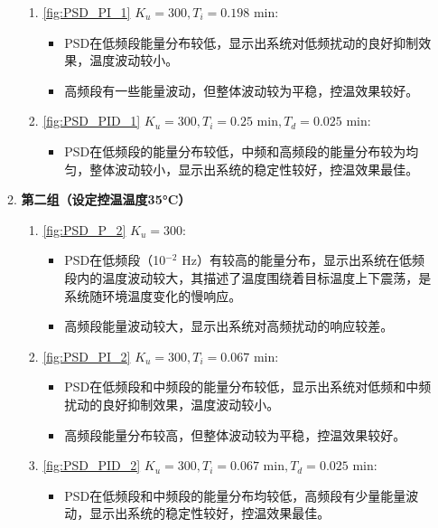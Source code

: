 \documentclass[dvipsnames, svgnames,a4paper,11pt]{article}
\begin{document}
\begin{enumerate}
\begin{enumerate}
\begin{enumerate}
                \item \cref{fig:PSD_PI_1} \( K_u = 300, T_i = 0.198 \text{ min} \):
                \begin{itemize}
                    \item PSD在低频段能量分布较低，显示出系统对低频扰动的良好抑制效果，温度波动较小。
                    \item 高频段有一些能量波动，但整体波动较为平稳，控温效果较好。
                \end{itemize}
                
                \item \cref{fig:PSD_PID_1} \( K_u = 300, T_i = 0.25 \text{ min}, T_d = 0.025 \text{ min} \):
                \begin{itemize}
                    \item PSD在低频段的能量分布较低，中频和高频段的能量分布较为均匀，整体波动较小，显示出系统的稳定性较好，控温效果最佳。
                \end{itemize}
            \end{enumerate}
        
            \item \textbf{第二组（设定控温温度35°C）}
            \begin{enumerate}
                \item \cref{fig:PSD_P_2} \( K_u = 300 \):
                \begin{itemize}
                    \item PSD在低频段（10$^{-2}$ Hz）有较高的能量分布，显示出系统在低频段内的温度波动较大，其描述了温度围绕着目标温度上下震荡，是系统随环境温度变化的慢响应。
                    \item 高频段能量波动较大，显示出系统对高频扰动的响应较差。
                \end{itemize}
                
                \item \cref{fig:PSD_PI_2} \( K_u = 300, T_i = 0.067 \text{ min} \):
                \begin{itemize}
                    \item PSD在低频段和中频段的能量分布较低，显示出系统对低频和中频扰动的良好抑制效果，温度波动较小。
                    \item 高频段能量分布较高，但整体波动较为平稳，控温效果较好。
                \end{itemize}
                
                \item \cref{fig:PSD_PID_2} \( K_u = 300, T_i = 0.067 \text{ min}, T_d = 0.025 \text{ min} \):
                \begin{itemize}
                    \item PSD在低频段和中频段的能量分布均较低，高频段有少量能量波动，显示出系统的稳定性较好，控温效果最佳。
                \end{itemize}
            \end{enumerate}
        

\end{enumerate}
\end{enumerate}
\end{document}
